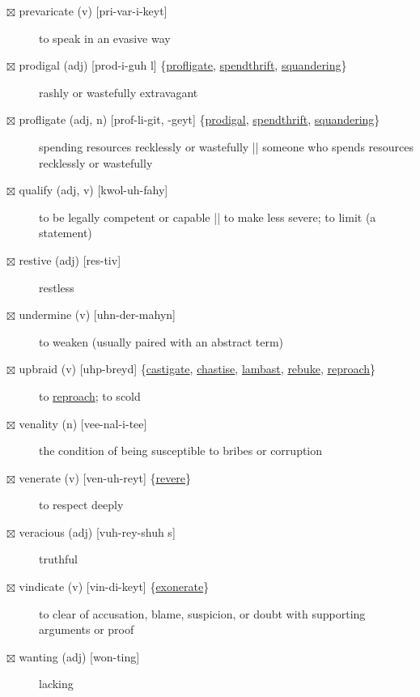 \documentclass[11pt]{article}
\begin{document}
\begin{description}
\item[{$\boxtimes$ prevaricate (v) [pri-var-i-keyt]}] to speak in an evasive way
\item[{$\boxtimes$ \label{orgf465044}prodigal (adj) [prod-i-guh l] \{\hyperref[orgc71b43a]{profligate}, \hyperref[org4fffebe]{spendthrift}, \hyperref[org5668651]{squandering}\}}] rashly or wastefully extravagant
\item[{$\boxtimes$ \label{orgc71b43a}profligate (adj, n) [prof-li-git, -geyt] \{\hyperref[orgf465044]{prodigal}, \hyperref[org4fffebe]{spendthrift}, \hyperref[org5668651]{squandering}\}}] spending resources recklessly or wastefully || someone who spends resources recklessly or wastefully
\item[{$\boxtimes$ qualify (adj, v) [kwol-uh-fahy]}] to be legally competent or capable || to make less severe; to limit (a statement)
\item[{$\boxtimes$ restive (adj) [res-tiv]}] restless
\item[{$\boxtimes$ undermine (v) [uhn-der-mahyn]}] to weaken (usually paired with an abstract term)
\item[{$\boxtimes$ \label{org6b90e9e}upbraid (v) [uhp-breyd] \{\hyperref[org41ed9c5]{castigate}, \hyperref[org578f0de]{chastise}, \hyperref[orgcb82180]{lambast}, \hyperref[org05472f9]{rebuke}, \hyperref[org3cb95b6]{reproach}\}}] to \hyperref[org3cb95b6]{reproach}; to scold
\item[{$\boxtimes$ venality (n) [vee-nal-i-tee]}] the condition of being susceptible to bribes or corruption
\item[{$\boxtimes$ \label{org4db2461} venerate (v) [ven-uh-reyt] \{\hyperref[org5bfd879]{revere}\}}] to respect deeply
\item[{$\boxtimes$ veracious (adj) [vuh-rey-shuh s]}] truthful
\item[{$\boxtimes$ \label{org7808c98}vindicate (v) [vin-di-keyt] \{\hyperref[org51dafe7]{exonerate}\}}] to clear of accusation, blame, suspicion, or doubt with supporting arguments or proof
\item[{$\boxtimes$ wanting (adj) [won-ting]}] lacking
\end{description}
\end{document}
